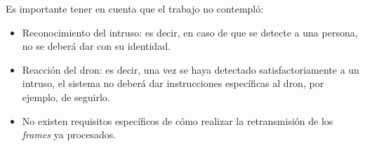 Es importante tener en cuenta que el trabajo no contempló:

\begin{itemize}

	\item Reconocimiento del intruso: es decir, en caso de que se detecte a una persona, no se deberá dar con su identidad.
	
	\item Reacción del dron: es decir, una vez se haya detectado satisfactoriamente a un intruso, el sistema no deberá dar instrucciones específicas al dron, por ejemplo, de seguirlo.
	
	\item No existen requisitos específicos de cómo realizar la retransmisión de los \textit{frames} ya procesados.

\end{itemize}



